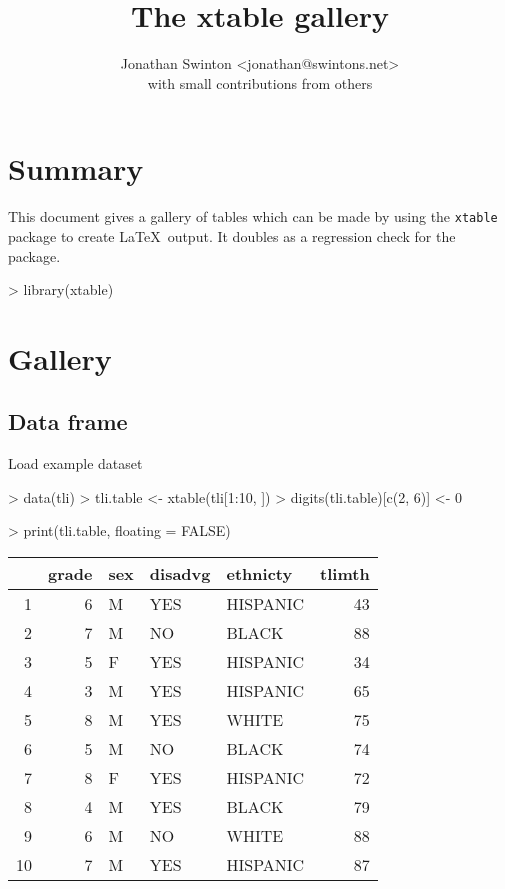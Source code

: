 \documentclass[letterpaper]{article}
\title{
The xtable gallery
}
\author{Jonathan Swinton <jonathan@swintons.net>\\ with small contributions from others}
\begin{document}
\maketitle
\section{Summary}
This document gives a gallery of tables which can be made 
by using the {\tt xtable} package to create \LaTeX\ output.
It doubles as a regression check for the package.

\begin{Schunk}
\begin{Sinput}
> library(xtable)
\end{Sinput}
\end{Schunk}

\section{Gallery}
\subsection{Data frame}
Load example dataset
\begin{Schunk}
\begin{Sinput}
> data(tli)
> tli.table <- xtable(tli[1:10, ])
> digits(tli.table)[c(2, 6)] <- 0
\end{Sinput}
\end{Schunk}
\begin{Schunk}
\begin{Sinput}
> print(tli.table, floating = FALSE)
\end{Sinput}
% latex table generated in R 2.6.0 by xtable 1.5-2 package
% Wed Oct 10 14:26:36 2007
\begin{tabular}{rrlllr}
  \hline
 & grade & sex & disadvg & ethnicty & tlimth \\
  \hline
1 & 6 & M & YES & HISPANIC & 43 \\
  2 & 7 & M & NO & BLACK & 88 \\
  3 & 5 & F & YES & HISPANIC & 34 \\
  4 & 3 & M & YES & HISPANIC & 65 \\
  5 & 8 & M & YES & WHITE & 75 \\
  6 & 5 & M & NO & BLACK & 74 \\
  7 & 8 & F & YES & HISPANIC & 72 \\
  8 & 4 & M & YES & BLACK & 79 \\
  9 & 6 & M & NO & WHITE & 88 \\
  10 & 7 & M & YES & HISPANIC & 87 \\
   \hline
\end{tabular}\end{Schunk}
\end{document}
